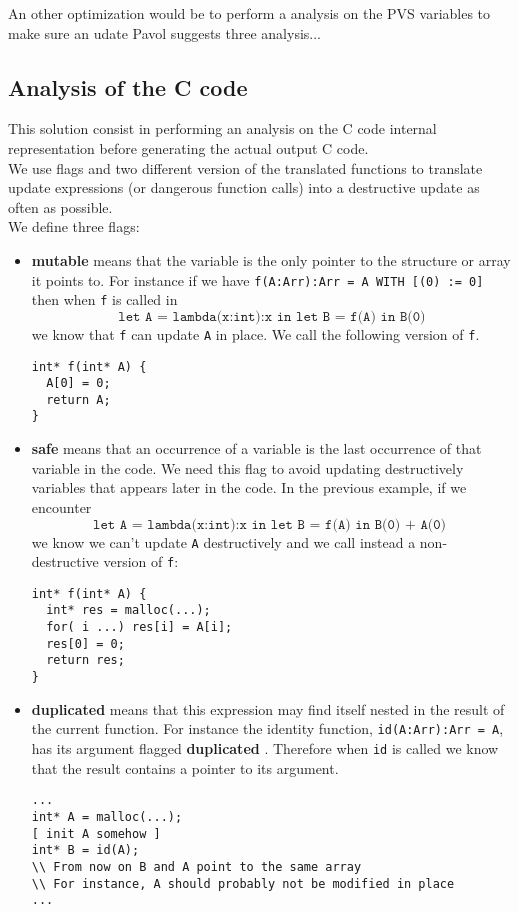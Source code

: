 \documentclass[12pt,a4paper]{article}
\newcommand{\cl}[1]{\texttt{#1}}
\newcommand{\bang}{ \textbf{ mutable } }
\newcommand{\safe}{ \textbf{ safe } }
\newcommand{\dupl}{ \textbf{ duplicated } }
\begin{document}
An other optimization would be to perform a analysis on the PVS variables to make sure an udate
Pavol \cite{pavol} suggests three analysis...



\subsection{Analysis of the C code}
\label{Canalysis}

This solution consist in performing an analysis on the C code internal representation before generating the actual output C code.\\

We use flags and two different version of the translated functions to translate update expressions (or dangerous function calls) into a destructive update as often as possible.\\


We define three flags:
\begin{itemize}
\item \bang means that the variable is the only pointer to the structure or array it points to. For instance if we have \cl{f(A:Arr):Arr = A WITH [(0) := 0]} then when \cl{f} is called in
$$ \cl{let A = lambda(x:int):x in let B = f(A) in B(0)} $$
we know that \cl{f} can update \cl{A} in place. We call the following version of \cl{f}.
\begin{lstlisting}
int* f(int* A) {
  A[0] = 0;
  return A;
}
\end{lstlisting}

\item \safe means that an occurrence of a variable is the last occurrence of that variable in the code. We need this flag to avoid updating destructively variables that appears later in the code. In the previous example, if we encounter
$$ \cl{let A = lambda(x:int):x in let B = f(A) in B(0) + A(0) }$$
we know we can't update \cl{A} destructively and we call instead a non-destructive version of \cl{f}:
\begin{lstlisting}
int* f(int* A) {
  int* res = malloc(...);
  for( i ...) res[i] = A[i];
  res[0] = 0;
  return res;
}
\end{lstlisting}

\item \dupl means that this expression may find itself nested in the result of the current function. For instance the identity function, \cl{id(A:Arr):Arr = A}, has its argument flagged \dupl. Therefore when \cl{id} is called we know that the result contains a pointer to its argument.
\begin{lstlisting}
...
int* A = malloc(...);
[ init A somehow ]
int* B = id(A);
\\ From now on B and A point to the same array
\\ For instance, A should probably not be modified in place
...
\end{lstlisting}
\end{itemize}
\end{document}
